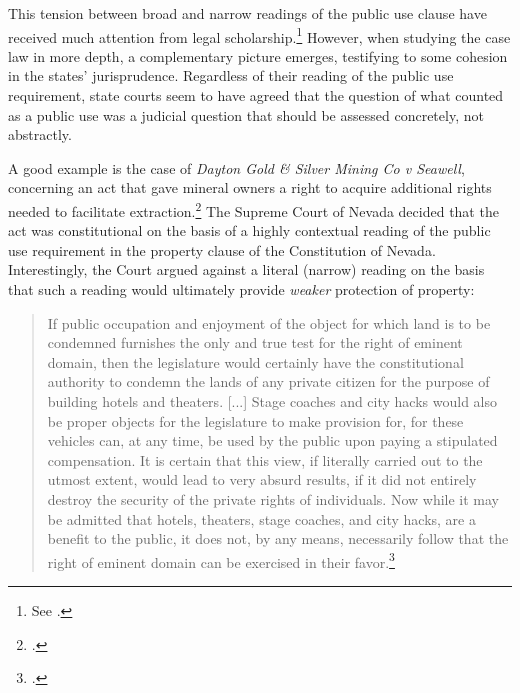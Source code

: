This tension between broad and narrow readings of the public use clause have received much attention from legal scholarship.\footnote{See \cite{nichols40,berger78,meidinger80,johnson11}.} However, when studying the case law in more depth, a complementary picture emerges, testifying to some cohesion in the states'
jurisprudence. Regardless of their reading of the public use requirement, state courts seem to have agreed that the question of what counted as a public use was a judicial question that should be assessed concretely, not abstractly.


A good example is the case of {\it Dayton Gold \& Silver Mining Co v Seawell}, concerning an act that gave mineral owners a right to acquire additional rights needed to facilitate extraction.\footcite{seawell76} The Supreme Court of Nevada decided that the act was constitutional on the basis of a highly contextual reading of the public use requirement in the property clause of the Constitution of Nevada. Interestingly, the Court argued against a literal (narrow) reading on the basis that such a reading would ultimately provide {\it weaker} protection of property:

\begin{quote}
If public occupation and enjoyment of the object for which land is to be condemned furnishes the only and true test for the right of eminent domain, then the legislature would certainly have the constitutional authority to condemn the lands of any private citizen for the purpose of building hotels and theaters. [...] Stage coaches and city hacks would also be proper objects for the legislature to make provision for, for these vehicles can, at any time, be used by the public upon paying a stipulated compensation. It is certain that this view, if literally carried out to the utmost extent, would lead to very absurd results, if it did not entirely destroy the security of the private rights of individuals. Now while it may be admitted that hotels, theaters, stage coaches, and city hacks, are a benefit to the public, it does not, by any means, necessarily follow that the right of eminent domain can be exercised in their favor.\footcite[410-411]{seawell76}
\end{quote}

